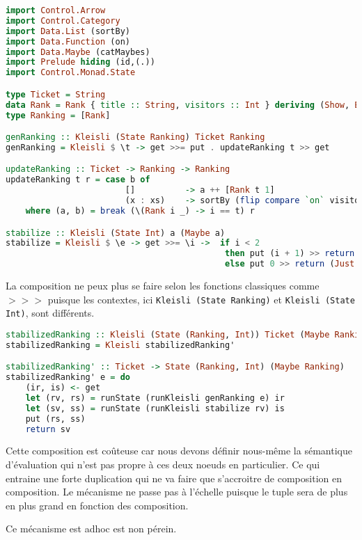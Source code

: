 \documentclass{llncs}
\begin{document}
\begin{lstlisting}[language=haskell]
import Control.Arrow
import Control.Category
import Data.List (sortBy)
import Data.Function (on)
import Data.Maybe (catMaybes)
import Prelude hiding (id,(.))
import Control.Monad.State

type Ticket = String
data Rank = Rank { title :: String, visitors :: Int } deriving (Show, Eq)
type Ranking = [Rank]

genRanking :: Kleisli (State Ranking) Ticket Ranking
genRanking = Kleisli $ \t -> get >>= put . updateRanking t >> get

updateRanking :: Ticket -> Ranking -> Ranking
updateRanking t r = case b of
                        []          -> a ++ [Rank t 1]
                        (x : xs)    -> sortBy (flip compare `on` visitors) (Rank t (1 + visitors x) : a ++ xs)
    where (a, b) = break (\(Rank i _) -> i == t) r

stabilize :: Kleisli (State Int) a (Maybe a)
stabilize = Kleisli $ \e -> get >>= \i ->  if i < 2
                                            then put (i + 1) >> return Nothing
                                            else put 0 >> return (Just e)
\end{lstlisting}

La composition ne peux plus se faire selon les fonctions classiques comme $>>>$
puisque les contextes, ici \texttt{Kleisli (State Ranking)} et \texttt{Kleisli (State Int)},
sont différents.

\begin{lstlisting}[language=haskell]
stabilizedRanking :: Kleisli (State (Ranking, Int)) Ticket (Maybe Ranking)
stabilizedRanking = Kleisli stabilizedRanking'

stabilizedRanking' :: Ticket -> State (Ranking, Int) (Maybe Ranking)
stabilizedRanking' e = do
    (ir, is) <- get
    let (rv, rs) = runState (runKleisli genRanking e) ir
    let (sv, ss) = runState (runKleisli stabilize rv) is
    put (rs, ss)
    return sv
\end{lstlisting}

Cette composition est coûteuse car nous devons définir nous-même la sémantique
d'évaluation qui n'est pas propre à ces deux noeuds en particulier.
Ce qui entraine une forte duplication qui ne va faire que s'accroitre de
composition en composition.
Le mécanisme ne passe pas à l'échelle puisque le tuple sera de plus en plus
grand en fonction des composition.

Ce mécanisme est adhoc est non pérein.
\end{document}
